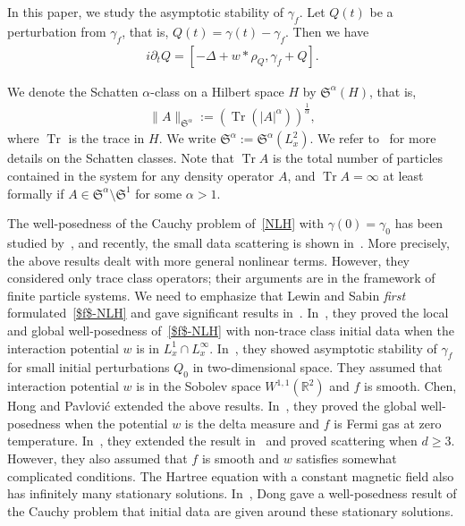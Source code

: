 \documentclass[10pt,a4paper]{amsart}
\newcommand{\BR}{\mathbb{R}}
\newcommand{\FS}{\mathfrak{S}}
\newcommand{\al}{\alpha}
\newcommand{\ga}{\gamma}
\newcommand{\rh}{\rho}
\newcommand{\De}{\Delta}
\newcommand{\pl}{\partial}
\newcommand{\K}[1]{\left(#1\right)}
\newcommand{\I}{\infty}
\DeclareMathOperator{\Tr}{Tr}
\begin{document}
In this paper, we study the asymptotic stability of $\ga_f$. Let $Q(t)$ be a perturbation from $\ga_f$, that is, $Q(t) = \ga(t) - \ga_f$. Then we have
\begin{align}\label{$f$-NLH}
\tag{$f$-NLH} 
i \pl_t Q = [-\De + w \ast \rh_Q, \ga_f + Q].
\end{align}

We denote the Schatten $\al$-class on a Hilbert space $H$ by $\FS^\al(H)$, that is,
\begin{align}
\|A\|_{\FS^\al}:= \K{\Tr(|A|^\al) }^{\frac{1}{\al}},
\end{align}
where $\Tr$ is the trace in $H$. We write $\FS^\al:=\FS^\al(L^2_x)$. We refer to~\cite{2005Simon} for more details on the Schatten classes. Note that $\Tr A$ is the total number of particles contained in the system for any density operator $A$, and $\Tr A = \I$ at least formally if $A \in \FS^\al \setminus \FS^1$ for some $\al >1$.

The well-posedness of the Cauchy problem of~\eqref{NLH} with $\ga(0)=\ga_0$ has been studied by~\cite{1974BDF, 1976BDF, 1976C, 1992Z}, and recently, the small data scattering is shown in~\cite{2021PS}. More precisely, the above results dealt with more general nonlinear terms. However, they considered only trace class operators; their arguments are in the framework of finite particle systems. We need to emphasize that Lewin and Sabin \emph{first} formulated~\eqref{$f$-NLH} and gave significant results in~\cite{2014LS,2015LS}. In~\cite{2015LS}, they proved the local and global well-posedness of~\eqref{$f$-NLH} with non-trace class initial data when the interaction potential $w$ is in $L^1_x \cap L^\I_x$. In~\cite{2014LS}, they showed asymptotic stability of $\ga_f$ for small initial perturbations $Q_0$ in two-dimensional space. They assumed that interaction potential $w$ is in the Sobolev space $W^{1,1}(\BR^2)$ and $f$ is smooth. Chen, Hong and Pavlovi\'{c} extended the above results. In~\cite{2017CHP}, they proved the global well-posedness when the potential $w$ is the delta measure and $f$ is Fermi gas at zero temperature. In~\cite{2018CHP}, they extended the result in~\cite{2014LS} and proved scattering when $d \ge 3$. However, they also assumed that $f$ is smooth and $w$ satisfies somewhat complicated conditions. The Hartree equation with a constant magnetic field also has infinitely many stationary solutions. In~\cite{2021D}, Dong gave a well-posedness result of the Cauchy problem that initial data are given around these stationary solutions.
\end{document}
